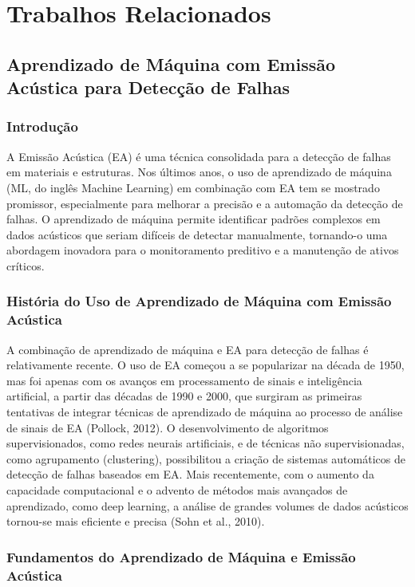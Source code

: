 \chapter{Trabalhos Relacionados}
\section{Aprendizado de Máquina com Emissão Acústica para Detecção de Falhas}

\subsection{Introdução}

A Emissão Acústica (EA) é uma técnica consolidada para a detecção de falhas em materiais e estruturas. Nos últimos anos, o uso de aprendizado de máquina (ML, do inglês Machine Learning) em combinação com EA tem se mostrado promissor, especialmente para melhorar a precisão e a automação da detecção de falhas. O aprendizado de máquina permite identificar padrões complexos em dados acústicos que seriam difíceis de detectar manualmente, tornando-o uma abordagem inovadora para o monitoramento preditivo e a manutenção de ativos críticos.

\subsection{História do Uso de Aprendizado de Máquina com Emissão Acústica}

A combinação de aprendizado de máquina e EA para detecção de falhas é relativamente recente. O uso de EA começou a se popularizar na década de 1950, mas foi apenas com os avanços em processamento de sinais e inteligência artificial, a partir das décadas de 1990 e 2000, que surgiram as primeiras tentativas de integrar técnicas de aprendizado de máquina ao processo de análise de sinais de EA (Pollock, 2012).
O desenvolvimento de algoritmos supervisionados, como redes neurais artificiais, e de técnicas não supervisionadas, como agrupamento (clustering), possibilitou a criação de sistemas automáticos de detecção de falhas baseados em EA. Mais recentemente, com o aumento da capacidade computacional e o advento de métodos mais avançados de aprendizado, como deep learning, a análise de grandes volumes de dados acústicos tornou-se mais eficiente e precisa (Sohn et al., 2010).

\subsection{Fundamentos do Aprendizado de Máquina e Emissão Acústica}

